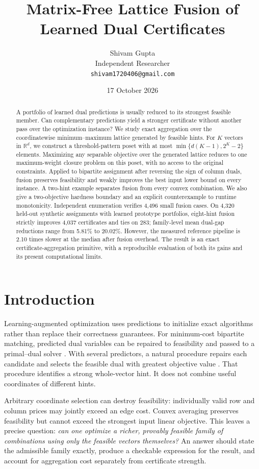 \documentclass[10pt,letterpaper]{article}
\title{Matrix-Free Lattice Fusion of\protect\\Learned Dual Certificates}
\author{Shivam Gupta\\Independent Researcher\\\texttt{shivam1720406@gmail.com}}
\date{17 October 2026}
\newcommand{\R}{\mathbb{R}}
\begin{document}
\maketitle
\begin{abstract}
A portfolio of learned dual predictions is usually reduced to its strongest feasible member. Can complementary predictions yield a stronger certificate without another pass over the optimization instance? We study exact aggregation over the coordinatewise minimum--maximum lattice generated by feasible hints. For $K$ vectors in $\R^d$, we construct a threshold-pattern poset with at most $\min\{d(K-1),2^K-2\}$ elements. Maximizing any separable objective over the generated lattice reduces to one maximum-weight closure problem on this poset, with no access to the original constraints. Applied to bipartite assignment after reversing the sign of column duals, fusion preserves feasibility and weakly improves the best input lower bound on every instance. A two-hint example separates fusion from every convex combination. We also give a two-objective hardness boundary and an explicit counterexample to runtime monotonicity. Independent enumeration verifies 4,496 small fusion cases. On 4,320 held-out synthetic assignments with learned prototype portfolios, eight-hint fusion strictly improves 4,037 certificates and ties on 283; family-level mean dual-gap reductions range from 5.81\% to 20.02\%. However, the measured reference pipeline is 2.10 times slower at the median after fusion overhead. The result is an exact certificate-aggregation primitive, with a reproducible evaluation of both its gains and its present computational limits.
\end{abstract}

\section{Introduction}
Learning-augmented optimization uses predictions to initialize exact algorithms rather than replace their correctness guarantees. For minimum-cost bipartite matching, predicted dual variables can be repaired to feasibility and passed to a primal--dual solver \citep{dinitz21}. With several predictors, a natural procedure repairs each candidate and selects the feasible dual with greatest objective value \citep{portfolios}. That procedure identifies a strong whole-vector hint. It does not combine useful coordinates of different hints.

Arbitrary coordinate selection can destroy feasibility: individually valid row and column prices may jointly exceed an edge cost. Convex averaging preserves feasibility but cannot exceed the strongest input linear objective. This leaves a precise question: \emph{can one optimize a richer, provably feasible family of combinations using only the feasible vectors themselves?} An answer should state the admissible family exactly, produce a checkable expression for the result, and account for aggregation cost separately from certificate strength.
\end{document}
